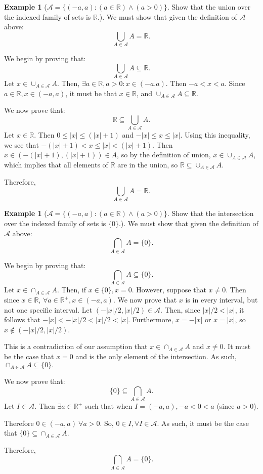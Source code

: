 \documentclass[10pt]{article}
\theoremstyle{definition}
\newtheorem{example}[equation]{Example}
\newcommand{\R}{\mathbb{R}}
\begin{document}
\begin{example}[$\mathcal{A} = \{(-a,a): (a\in\R) \land (a>0)\}.$ Show that the union over the indexed family of sets is $\R$.]
  We must show that given the definition of $\mathcal{A}$ above:
  $$\bigcup_{A\in\mathcal{A}}A = \R.$$

  We begin by proving that:
  $$\bigcup_{A\in\mathcal{A}}A\subseteq\R.$$
  Let $x\in\cup_{A\in\mathcal{A}}A$. Then, $\exists a\in\R,a>0:x\in(-a.a)$. Then $-a<x<a$. Since $a\in\R,x\in(-a,a)$, it must be that $x\in\R$, and $\cup_{A\in\mathcal{A}}A\subseteq\R$.

  We now prove that:
  $$\R\subseteq\bigcup_{A\in\mathcal{A}}A.$$
  Let $x\in\R$. Then $0\leq|x|\leq(|x|+1)$ and $-|x|\leq x\leq|x|$. Using this inequality, we see that $-(|x|+1)<x\leq|x|<(|x|+1)$. Then $x\in(-(|x|+1),(|x|+1))\in A$, so by the definition of union, $x\in\cup_{A\in\mathcal{A}}A$, which implies that all elements of $\R$ are in the union, so $\R\subseteq\cup_{A\in\mathcal{A}}A$.

  Therefore,
  $$\bigcup_{A\in\mathcal{A}}A=\R.$$
\end{example}

\begin{example}[$\mathcal{A} = \{(-a,a): (a\in\R) \land (a>0)\}.$ Show that the intersection over the indexed family of sets is $\{0\}$.]
  We must show that given the definition of $\mathcal{A}$ above:
  $$\bigcap_{A\in\mathcal{A}}A = \{0\}.$$

  We begin by proving that:
  $$\bigcap_{A\in\mathcal{A}}A\subseteq\{0\}.$$
  Let $x\in\cap_{A\in\mathcal{A}}A$. Then, if $x\in\{0\},x=0$. However, suppose that $x\neq0.$ Then since $x\in\R$, $\forall a\in\R^+,x\in(-a,a)$. We now prove that $x$ is in every interval, but not one specific interval. Let $(-|x|/2,|x|/2)\in\mathcal{A}$. Then, since $|x|/2 < |x|$, it follows that $-|x| < -|x|/2 < |x|/2 < |x|$. Furthermore, $x=-|x|$ or $x=|x|$, so $x\not\in(-|x|/2,|x|/2)$.

  This is a contradiction of our assumption that $x\in\cap_{A\in\mathcal{A}}A$ and $x\neq0$. It must be the case that $x=0$ and is the only element of the intersection. As such, $\cap_{A\in\mathcal{A}}A\subseteq\{0\}.$

  We now prove that:
  $$\{0\}\subseteq\bigcap_{A\in\mathcal{A}}A.$$
  Let $I\in\mathcal{A}$. Then $\exists a\in\R^+$ such that when $I=(-a,a), -a<0<a$ (since $a>0$).

  Therefore $0\in(-a,a)\ \forall a>0$. So, $0\in I, \forall I \in\mathcal{A}$. As such, it must be the case that $\{0\}\subseteq\cap_{A\in\mathcal{A}}A.$

  Therefore,
  $$\bigcap_{A\in\mathcal{A}}A = \{0\}.$$
\end{example}
\end{document}
